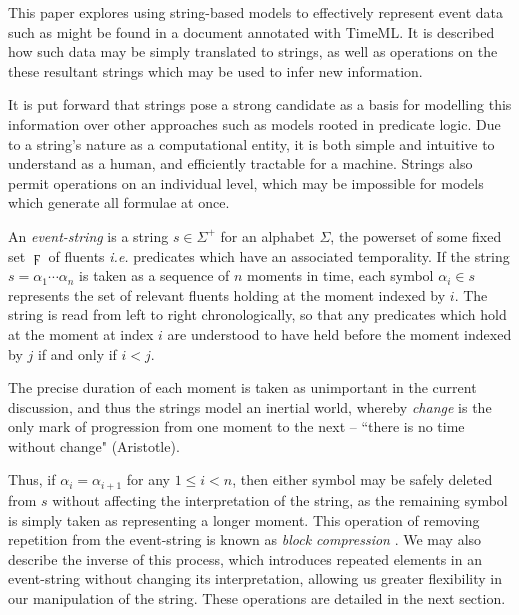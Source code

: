 \documentclass[a4paper,11pt]{article}
\begin{document}
This paper explores using string-based models to effectively represent event 
data such as might be found in a document annotated with TimeML. It is 
described how such data may be simply translated to strings, as well as 
operations on the these resultant strings which may be used to infer new 
information.

It is put forward that strings pose a strong candidate as a basis for modelling 
this information over other approaches such as models rooted in predicate 
logic. Due to a string's nature as a computational entity, it is both simple 
and intuitive to understand as a human, and efficiently tractable for a 
machine. Strings also permit operations on an individual level, which may be 
impossible for models which generate all formulae at once.

An \textit{event-string} is a string $s \in \Sigma^+$ for an alphabet 
$\Sigma$, the powerset of some fixed set $\digamma$ of fluents \textit{i.e.} 
predicates which have an associated temporality. If the 
string $s = \alpha_1\cdots\alpha_n$ is taken as a sequence of $n$ moments in 
time, each symbol $\alpha_i \in s$ represents the set of relevant fluents 
holding at the 
moment indexed by $i$. The string is read from left to right chronologically, 
so that any predicates which hold at the moment at index $i$ are understood to 
have held before the moment indexed by $j$ if and only if $i < j$.

The precise duration of each moment is taken as unimportant in the current 
discussion, 
and thus the strings model an inertial world, whereby \textit{change} is the 
only mark of progression from one moment to the next -- ``there is no time 
without change" (Aristotle).

Thus, if $\alpha_i = \alpha_{i+1}$ for any 
$1 \leq i < n$, then either symbol may be safely deleted from $s$ without 
affecting the interpretation of the string, as the remaining symbol is simply 
taken as representing a longer moment. This operation of removing 
repetition from 
the event-string is known as \textit{block compression} 
\citep{fernando2016prior}. We may also describe 
the inverse of this process, which introduces repeated elements in an 
event-string without changing its interpretation, allowing us greater 
flexibility in our manipulation of the string. These operations are detailed 
in the next section.
\end{document}
